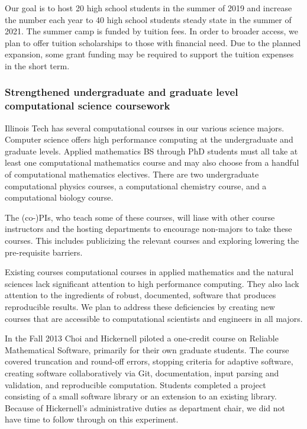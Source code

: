 \documentclass[11pt]{NSFamsart}
\begin{document}
Our goal is to host 20 high school students in the summer of 2019 and increase the number each year to 40 high school students steady state in the summer of 2021.  The summer camp is funded by tuition fees.  In order to broader access, we plan to offer tuition scholarships to those with financial need.  Due to the planned expansion, some grant funding may be required to support the tuition expenses in the short term.

\subsubsection*{Strengthened undergraduate and graduate level computational science coursework} Illinois Tech has several computational courses in our various science majors.  Computer science offers high performance computing at the undergraduate and graduate levels.  Applied mathematics BS through PhD students must all take at least one computational mathematics course and may also choose from a handful of computational mathematics electives. There are two undergraduate computational physics courses, a computational chemistry course, and a computational biology course.

The (co-)PIs, who teach some of these courses, will liase  with other course instructors and the hosting departments to encourage non-majors to take these courses.  This includes publicizing the relevant courses and exploring lowering the pre-requisite barriers.

Existing courses computational courses in applied mathematics and the natural sciences lack significant attention to high performance computing.  They also lack attention to the ingredients of robust, documented, software that produces reproducible results.  We plan to address these deficiencies by creating new courses that are accessible to computational scientists and engineers in all majors.

In the Fall 2013 Choi and Hickernell piloted a one-credit course on Reliable Mathematical Software, primarily for their own graduate students.  The course covered truncation and round-off errors,
stopping criteria for adaptive software,
creating software collaboratively via Git, 
documentation,
input parsing and validation, and
reproducible computation.
Students completed a project consisting of a small software library or an extension to an existing library.  Because of Hickernell's administrative duties as department chair, we did not have time to follow through on this experiment.  
\end{document}
